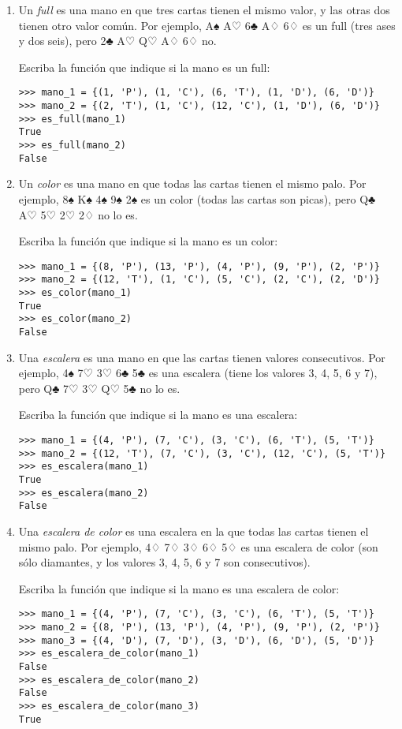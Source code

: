 \begin{enumerate}
\item
  Un \emph{full} es una mano en que tres cartas tienen el mismo valor, y
  las otras dos tienen otro valor común.
  Por ejemplo,
  A♠ A♡ 6♣ A♢ 6♢
  es un full (tres ases y dos seis), pero
  2♣ A♡ Q♡ A♢ 6♢
  no.

  Escriba la función que indique si la mano es un full:
\begin{lstlisting}
>>> mano_1 = {(1, 'P'), (1, 'C'), (6, 'T'), (1, 'D'), (6, 'D')}
>>> mano_2 = {(2, 'T'), (1, 'C'), (12, 'C'), (1, 'D'), (6, 'D')}
>>> es_full(mano_1)
True
>>> es_full(mano_2)
False
\end{lstlisting}

\item
  Un \emph{color} es una mano en que todas las cartas tienen el mismo
  palo.
  Por ejemplo,
  8♠ K♠ 4♠ 9♠ 2♠
  es un color (todas las cartas son picas), pero
  Q♣ A♡ 5♡ 2♡ 2♢
  no lo es.

  Escriba la función que indique si la mano es un color:
\begin{lstlisting}
>>> mano_1 = {(8, 'P'), (13, 'P'), (4, 'P'), (9, 'P'), (2, 'P')}
>>> mano_2 = {(12, 'T'), (1, 'C'), (5, 'C'), (2, 'C'), (2, 'D')}
>>> es_color(mano_1)
True
>>> es_color(mano_2)
False
\end{lstlisting}

\item
  Una \emph{escalera} es una mano en que las cartas tienen valores
  consecutivos. Por ejemplo,
  4♠ 7♡ 3♡ 6♣ 5♣
  es una escalera (tiene los valores 3, 4, 5, 6 y 7), pero
  Q♣ 7♡ 3♡ Q♡ 5♣
  no lo es.

  Escriba la función que indique si la mano es una escalera:
\begin{lstlisting}
>>> mano_1 = {(4, 'P'), (7, 'C'), (3, 'C'), (6, 'T'), (5, 'T')}
>>> mano_2 = {(12, 'T'), (7, 'C'), (3, 'C'), (12, 'C'), (5, 'T')}
>>> es_escalera(mano_1)
True
>>> es_escalera(mano_2)
False
\end{lstlisting}

\item
  Una \emph{escalera de color} es una escalera en la que todas las
  cartas tienen el mismo palo. Por ejemplo,
  4♢ 7♢ 3♢ 6♢ 5♢
  es una escalera de color (son sólo diamantes, y los valores
  3, 4, 5, 6 y 7 son consecutivos).

  Escriba la función que indique si la mano es una escalera de color:
\begin{lstlisting}
>>> mano_1 = {(4, 'P'), (7, 'C'), (3, 'C'), (6, 'T'), (5, 'T')}
>>> mano_2 = {(8, 'P'), (13, 'P'), (4, 'P'), (9, 'P'), (2, 'P')}
>>> mano_3 = {(4, 'D'), (7, 'D'), (3, 'D'), (6, 'D'), (5, 'D')}
>>> es_escalera_de_color(mano_1)
False
>>> es_escalera_de_color(mano_2)
False
>>> es_escalera_de_color(mano_3)
True
\end{lstlisting}


\end{enumerate}
